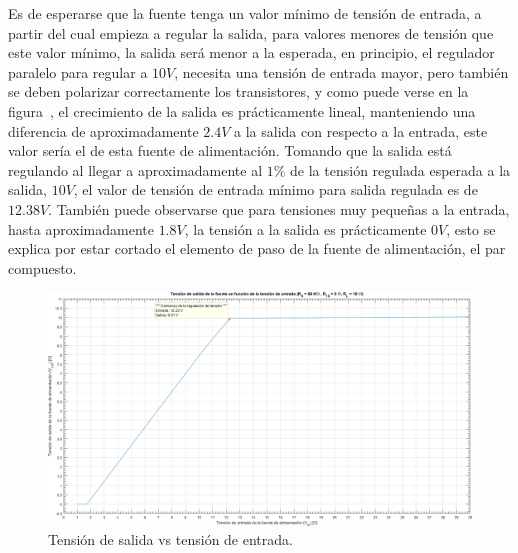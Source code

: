 \vspace{1.5cm}

Es de esperarse que la fuente tenga un valor mínimo de tensión de entrada, a partir del cual empieza a regular la salida, para valores menores de tensión que este valor mínimo, la salida será menor a la esperada, en principio, el regulador paralelo para regular a $10 V$, necesita una tensión de entrada mayor, pero también se deben polarizar correctamente los transistores, y como puede verse en la figura~, el crecimiento de la salida es prácticamente lineal, manteniendo una diferencia de aproximadamente $2.4V$ a la salida con respecto a la entrada, este valor sería el  de esta fuente de alimentación. Tomando que la salida está regulando al 
llegar a aproximadamente al $1 \%$ de la tensión regulada esperada a la salida, $10 V$, el valor de tensión de entrada mínimo para salida regulada es de $12.38 V$. También puede observarse que para tensiones muy pequeñas a la entrada, hasta aproximadamente $1.8 V$, la tensión a la salida es prácticamente $0 V$, esto se explica por estar cortado el elemento de paso de la fuente de alimentación, el par compuesto.

\vfill

\clearpage

\begin{figure}[H] %
\begin{center}
\includegraphics[width=1.2 \textwidth, angle=90]{./img/preguntas/p18.png}
\caption{\label{fig:fig_p18_vo_vs_vi}\footnotesize{Tensión de salida vs tensión de entrada.}}
\end{center}
\end{figure}

\clearpage